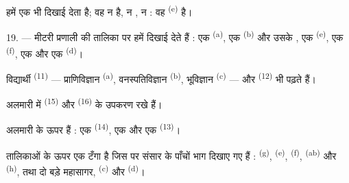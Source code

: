हमें एक  भी दिखाई देता है; वह न  है, न
, न  : वह  \textsuperscript{(e)} है।

19. --- मीटरी प्रणाली की तालिका पर हमें दिखाई देते हैं : एक 
\textsuperscript{(a)}, एक  \textsuperscript{(b)} और उसके ,
एक  \textsuperscript{(e)}, एक  \textsuperscript{(f)}, एक
 और एक  \textsuperscript{(d)}।

विद्यार्थी  \textsuperscript{(11)} --- प्राणिविज्ञान
\textsuperscript{(a)}, वनस्पतिविज्ञान \textsuperscript{(b)}, भूविज्ञान
\textsuperscript{(c)} --- और  \textsuperscript{(12)} भी पढ़ते हैं।

अलमारी में  \textsuperscript{(15)} और 
\textsuperscript{(16)} के उपकरण रखे हैं।

अलमारी के ऊपर हैं : एक  \textsuperscript{(14)}, एक  और
एक  \textsuperscript{(13)}।

तालिकाओं के ऊपर एक  टँगा है जिस पर संसार के पाँचों भाग दिखाए
गए हैं :  \textsuperscript{(g)},  \textsuperscript{(e)},
 \textsuperscript{(f)},  \textsuperscript{(ab)} और
 \textsuperscript{(h)}, तथा दो बड़े महासागर, 
\textsuperscript{(c)} और  \textsuperscript{(d)}।
\VUsaut{6.0mm}
\VUfilet{22mm}
